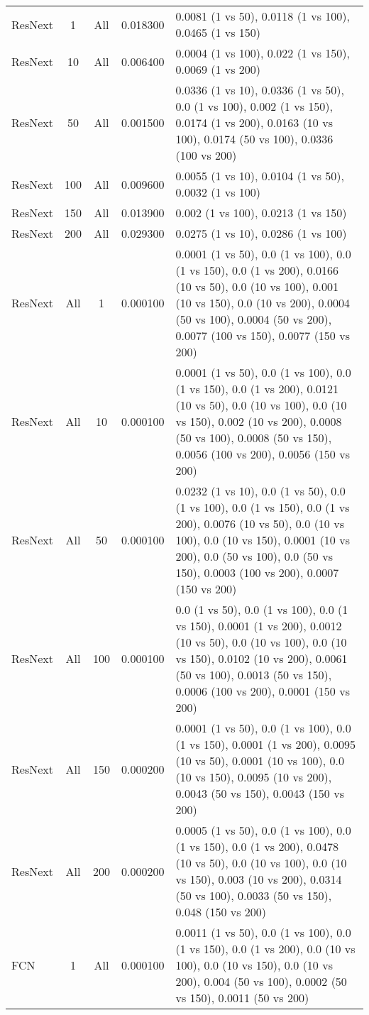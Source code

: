 \begin{tabular}{|l|c|c|c|p{7cm}|}
ResNext & 1 & All & 0.018300 & 0.0081 (1 vs 50), 0.0118 (1 vs 100), 0.0465 (1 vs 150) \\
ResNext & 10 & All & 0.006400 & 0.0004 (1 vs 100), 0.022 (1 vs 150), 0.0069 (1 vs 200) \\
ResNext & 50 & All & 0.001500 & 0.0336 (1 vs 10), 0.0336 (1 vs 50), 0.0 (1 vs 100), 0.002 (1 vs 150), 0.0174 (1 vs 200), 0.0163 (10 vs 100), 0.0174 (50 vs 100), 0.0336 (100 vs 200) \\
ResNext & 100 & All & 0.009600 & 0.0055 (1 vs 10), 0.0104 (1 vs 50), 0.0032 (1 vs 100) \\
ResNext & 150 & All & 0.013900 & 0.002 (1 vs 100), 0.0213 (1 vs 150) \\
ResNext & 200 & All & 0.029300 & 0.0275 (1 vs 10), 0.0286 (1 vs 100) \\
ResNext & All & 1 & 0.000100 & 0.0001 (1 vs 50), 0.0 (1 vs 100), 0.0 (1 vs 150), 0.0 (1 vs 200), 0.0166 (10 vs 50), 0.0 (10 vs 100), 0.001 (10 vs 150), 0.0 (10 vs 200), 0.0004 (50 vs 100), 0.0004 (50 vs 200), 0.0077 (100 vs 150), 0.0077 (150 vs 200) \\
ResNext & All & 10 & 0.000100 & 0.0001 (1 vs 50), 0.0 (1 vs 100), 0.0 (1 vs 150), 0.0 (1 vs 200), 0.0121 (10 vs 50), 0.0 (10 vs 100), 0.0 (10 vs 150), 0.002 (10 vs 200), 0.0008 (50 vs 100), 0.0008 (50 vs 150), 0.0056 (100 vs 200), 0.0056 (150 vs 200) \\
ResNext & All & 50 & 0.000100 & 0.0232 (1 vs 10), 0.0 (1 vs 50), 0.0 (1 vs 100), 0.0 (1 vs 150), 0.0 (1 vs 200), 0.0076 (10 vs 50), 0.0 (10 vs 100), 0.0 (10 vs 150), 0.0001 (10 vs 200), 0.0 (50 vs 100), 0.0 (50 vs 150), 0.0003 (100 vs 200), 0.0007 (150 vs 200) \\
ResNext & All & 100 & 0.000100 & 0.0 (1 vs 50), 0.0 (1 vs 100), 0.0 (1 vs 150), 0.0001 (1 vs 200), 0.0012 (10 vs 50), 0.0 (10 vs 100), 0.0 (10 vs 150), 0.0102 (10 vs 200), 0.0061 (50 vs 100), 0.0013 (50 vs 150), 0.0006 (100 vs 200), 0.0001 (150 vs 200) \\
ResNext & All & 150 & 0.000200 & 0.0001 (1 vs 50), 0.0 (1 vs 100), 0.0 (1 vs 150), 0.0001 (1 vs 200), 0.0095 (10 vs 50), 0.0001 (10 vs 100), 0.0 (10 vs 150), 0.0095 (10 vs 200), 0.0043 (50 vs 150), 0.0043 (150 vs 200) \\
ResNext & All & 200 & 0.000200 & 0.0005 (1 vs 50), 0.0 (1 vs 100), 0.0 (1 vs 150), 0.0 (1 vs 200), 0.0478 (10 vs 50), 0.0 (10 vs 100), 0.0 (10 vs 150), 0.003 (10 vs 200), 0.0314 (50 vs 100), 0.0033 (50 vs 150), 0.048 (150 vs 200) \\
FCN & 1 & All & 0.000100 & 0.0011 (1 vs 50), 0.0 (1 vs 100), 0.0 (1 vs 150), 0.0 (1 vs 200), 0.0 (10 vs 100), 0.0 (10 vs 150), 0.0 (10 vs 200), 0.004 (50 vs 100), 0.0002 (50 vs 150), 0.0011 (50 vs 200) \\

\end{tabular}
